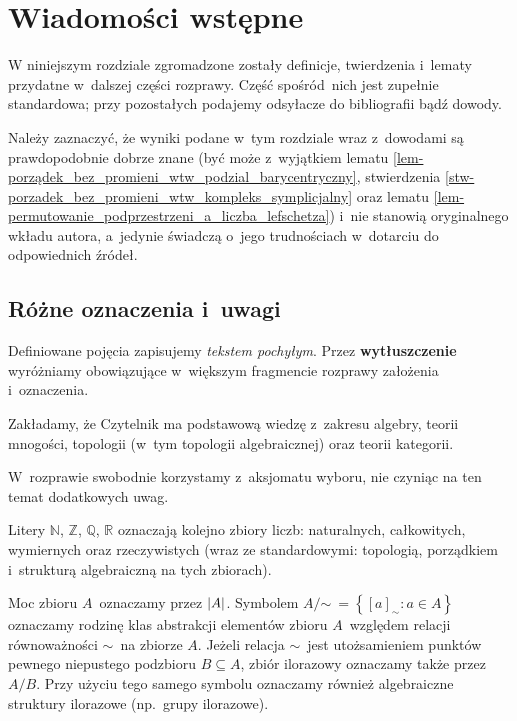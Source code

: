 \chapter{Wiadomości wstępne}\label{chapter1}
W niniejszym rozdziale zgromadzone zostały definicje, twierdzenia i~lematy przydatne w~dalszej części rozprawy. Część spośród~nich jest zupełnie standardowa; przy pozostałych podajemy odsyłacze do bibliografii bądź dowody. 

Należy zaznaczyć, że wyniki podane w~tym rozdziale wraz z~dowodami są prawdopodobnie dobrze znane (być może z~wyjątkiem lematu \ref{lem-porządek_bez_promieni_wtw_podzial_barycentryczny}, stwierdzenia \ref{stw-porzadek_bez_promieni_wtw_kompleks_symplicjalny} oraz lematu \ref{lem-permutowanie_podprzestrzeni_a_liczba_lefschetza}) i~nie stanowią oryginalnego wkładu autora, a~jedynie świadczą o~jego trudnościach w~dotarciu do odpowiednich źródeł. 



\section{Różne oznaczenia i~uwagi}
Definiowane pojęcia zapisujemy \textit{tekstem pochyłym}. Przez \textbf{wytłuszczenie} wyróżniamy obowiązujące w~większym fragmencie rozprawy założenia i~oznaczenia.

Zakładamy, że Czytelnik ma podstawową wiedzę z~zakresu algebry, teorii mnogości, topologii (w~tym topologii algebraicznej) oraz teorii kategorii. 

W~rozprawie swobodnie korzystamy z~aksjomatu wyboru, nie czyniąc na ten temat dodatkowych uwag.

Litery $\mathbb{N}$, $\mathbb{Z}$, $\mathbb{Q}$, $\mathbb{R}$ oznaczają kolejno zbiory liczb: naturalnych, całkowitych, wymiernych oraz rzeczywistych (wraz ze standardowymi: topologią, porządkiem i~strukturą algebraiczną na tych zbiorach). 

Moc zbioru $A$~oznaczamy przez $\left|A\right|$. Symbolem $A\big/\mathord{\sim}\ =\left\{[a]_\sim:a\in A\right\}$ oznaczamy rodzinę klas abstrakcji elementów zbioru $A$~względem relacji równoważności $\sim$~na zbiorze $A$. Jeżeli relacja $\sim$~jest utożsamieniem punktów pewnego niepustego podzbioru $B\subseteq A$, zbiór ilorazowy oznaczamy także przez $A\big/B$. Przy użyciu tego samego symbolu oznaczamy również algebraiczne struktury ilorazowe (np.~grupy ilorazowe).

